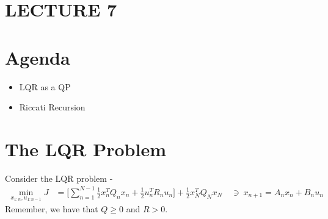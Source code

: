 \newpage
\section{LECTURE 7}

\section{Agenda}
\begin{itemize}
    \item LQR as a QP
    \item Riccati Recursion
\end{itemize}

\section{The LQR Problem}
Consider the LQR problem - 
\begin{align}
    \min_{x_{1:n}, u_{1:n-1}} J &= \Big[ \sum_{n=1}^{N-1} \frac{1}{2} x_n^T Q_n x_n + \frac{1}{2} u_n^T R_n u_n \Big] + \frac{1}{2} x_N^T Q_N x_N
    \ &\ni \ x_{n+1} = A_n x_n + B_n u_n
\end{align}
Remember, we have that $Q\geq0$ and $R>0$. 

